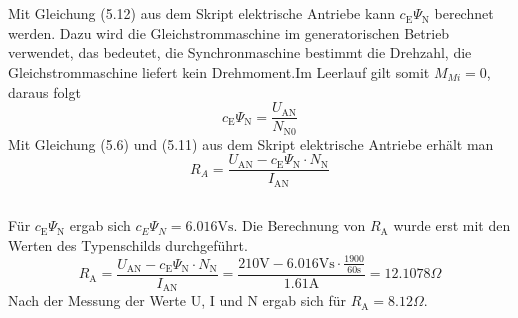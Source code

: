 \chapter{}\label{ex:aufg3}
%
\section{}\label{sec:aufg3a}
Mit Gleichung (5.12) aus dem Skript elektrische Antriebe kann $c_\text{E} \Psi_\text{N}$ berechnet werden. Dazu wird die Gleichstrommaschine im generatorischen Betrieb verwendet, das bedeutet, die Synchronmaschine bestimmt die Drehzahl, die Gleichstrommaschine liefert kein Drehmoment.Im Leerlauf gilt somit $M_{Mi} = 0$, daraus folgt
\begin{equation}
c_\text{E} \Psi_\text{N} = \frac{U_{\text{AN}}}{N_{\text{N}0}}
\end{equation} 
Mit Gleichung (5.6) und (5.11) aus dem Skript elektrische Antriebe erhält man
\begin{equation}
R_A = \frac{U_{\text{AN}} - c_\text{E} \Psi_\text{N} \cdot N_\text{N}}{I_{\text{AN}}}
\end{equation} 

\section{}\label{sec:aufg3b}
%
Für $c_\text{E} \Psi_\text{N}$ ergab sich $c_E \Psi_N = 6.016 \text{Vs}$.
Die Berechnung von $R_\text{A}$ wurde erst mit den Werten des Typenschilds durchgeführt.
\begin{equation}
R_\text{A} = \frac{U_{\text{AN}} - c_\text{E} \Psi_\text{N} \cdot N_\text{N}}{I_{\text{AN}}} = \frac{210 \text{V} - 6.016\text{Vs} \cdot \frac{1900}{60\text{s}}}{1.61\text{A}} = 12.1078 \Omega
\end{equation}
Nach der Messung der Werte U, I und N ergab sich für $R_\text{A} = 8.12\Omega$.

\clearpage